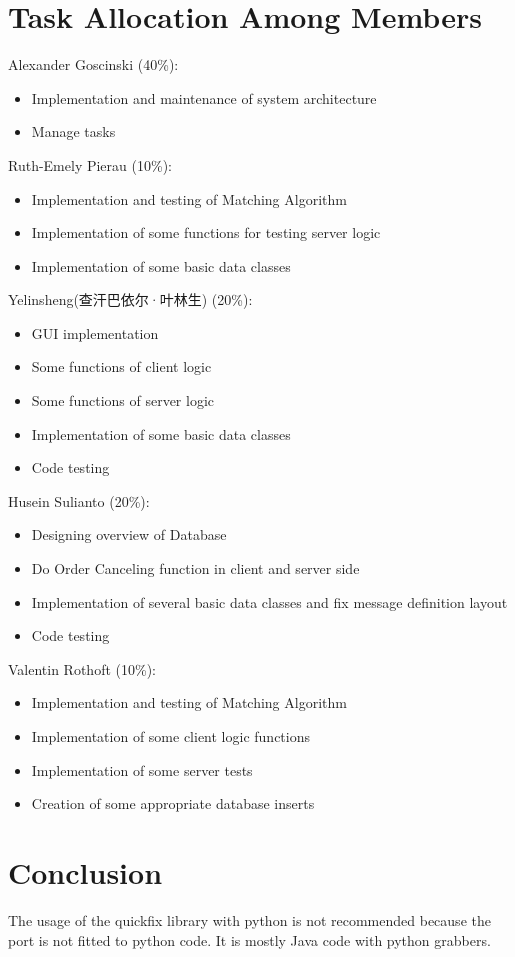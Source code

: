 \documentclass[a4paper, 11pt]{article}
\begin{document}
\section*{Task Allocation Among Members}

Alexander Goscinski (40\%):
\begin{itemize}
  \item Implementation and maintenance of system architecture
  \item Manage tasks
\end{itemize}
Ruth-Emely Pierau (10\%):
\begin{itemize}
	\item Implementation and testing of Matching Algorithm
	\item Implementation of some functions for testing server logic
	\item Implementation of some basic data classes
\end{itemize}
Yelinsheng(查汗巴依尔·叶林生) (20\%):
\begin{itemize}
  \item GUI implementation
  \item Some functions of client logic
  \item Some functions of server logic
  \item Implementation of some basic data classes
  \item Code testing
\end{itemize}
Husein Sulianto (20\%):
\begin{itemize}
  \item Designing overview of Database
  \item Do Order Canceling function in client and server side
  \item Implementation of several basic data classes and fix message definition layout
  \item Code testing
\end{itemize}
Valentin Rothoft (10\%):
\begin{itemize}
  \item Implementation and testing of Matching Algorithm
  \item Implementation of some client logic functions
  \item Implementation of some server tests
  \item Creation of some appropriate database inserts
\end{itemize}

\section*{Conclusion}
The usage of the quickfix library with python is not recommended because the port is not fitted to python code. It is mostly Java code with python grabbers.
\end{document}
